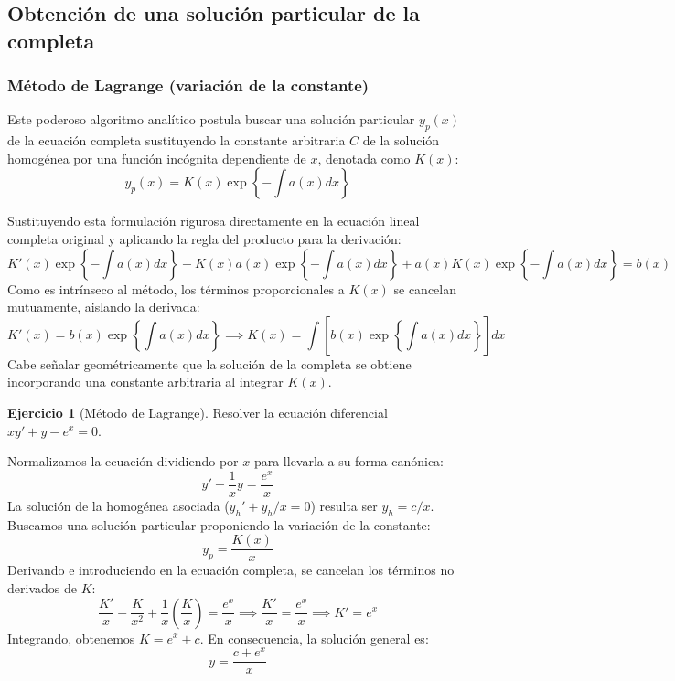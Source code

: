 \documentclass[11pt,a4paper]{article}
\theoremstyle{definition}
\newtheorem{exercise}{Ejercicio}[section]
\theoremstyle{plain}
\begin{document}
\subsection{Obtención de una solución particular de la completa}

\subsubsection{Método de Lagrange (variación de la constante)}

Este poderoso algoritmo analítico postula buscar una solución particular $y_p(x)$ de la ecuación completa sustituyendo la constante arbitraria $C$ de la solución homogénea por una función incógnita dependiente de $x$, denotada como $K(x)$:
$$ y_p(x) = K(x) \exp\left\{ -\int a(x)dx \right\} $$

Sustituyendo esta formulación rigurosa directamente en la ecuación lineal completa original y aplicando la regla del producto para la derivación:
$$ K'(x)\exp\left\{ -\int a(x)dx \right\} - K(x)a(x)\exp\left\{ -\int a(x)dx \right\} + a(x)K(x)\exp\left\{ -\int a(x)dx \right\} = b(x) $$
Como es intrínseco al método, los términos proporcionales a $K(x)$ se cancelan mutuamente, aislando la derivada:
$$ K'(x) = b(x) \exp\left\{ \int a(x)dx \right\} \implies K(x) = \int \left[ b(x) \exp\left\{ \int a(x)dx \right\} \right] dx $$
Cabe señalar geométricamente que la solución de la completa se obtiene incorporando una constante arbitraria al integrar $K(x)$.

\begin{exercise}[Método de Lagrange]
Resolver la ecuación diferencial $xy' + y - e^x = 0$.
\end{exercise}

\begin{tcolorbox}
Normalizamos la ecuación dividiendo por $x$ para llevarla a su forma canónica:
$$ y' + \frac{1}{x}y = \frac{e^x}{x} $$
La solución de la homogénea asociada ($y_h' + y_h/x = 0$) resulta ser $y_h = c/x$. 
Buscamos una solución particular proponiendo la variación de la constante:
$$ y_p = \frac{K(x)}{x} $$
Derivando e introduciendo en la ecuación completa, se cancelan los términos no derivados de $K$:
$$ \frac{K'}{x} - \frac{K}{x^2} + \frac{1}{x}\left(\frac{K}{x}\right) = \frac{e^x}{x} \implies \frac{K'}{x} = \frac{e^x}{x} \implies K' = e^x $$
Integrando, obtenemos $K = e^x + c$. En consecuencia, la solución general es:
$$ y = \frac{c + e^x}{x} $$
\end{tcolorbox}
\end{document}
